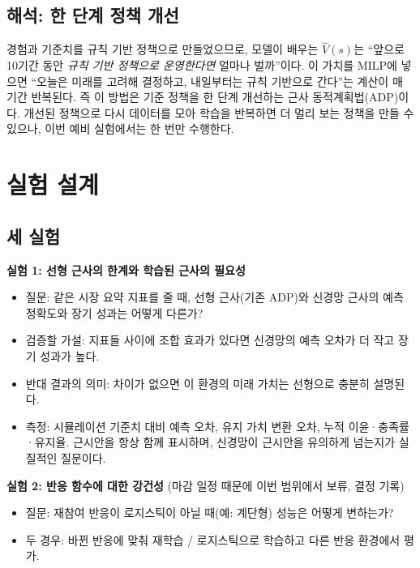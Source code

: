 \documentclass[11pt,a4paper]{article}
\begin{document}
\subsection{해석: 한 단계 정책 개선}

경험과 기준치를 규칙 기반 정책으로 만들었으므로, 모델이 배우는 $\hat V(s)$는
``앞으로 10기간 동안 \emph{규칙 기반 정책으로 운영한다면} 얼마나 벌까''이다.
이 가치를 MILP에 넣으면 ``오늘은 미래를 고려해 결정하고, 내일부터는 규칙 기반으로 간다''는
계산이 매 기간 반복된다. 즉 이 방법은 기준 정책을 한 단계 개선하는 근사 동적계획법(ADP)이다.
개선된 정책으로 다시 데이터를 모아 학습을 반복하면 더 멀리 보는 정책을 만들 수 있으나,
이번 예비 실험에서는 한 번만 수행한다.

\section{실험 설계}

\subsection{세 실험}

\textbf{실험 1: 선형 근사의 한계와 학습된 근사의 필요성}
\begin{itemize}[leftmargin=1.5em]
  \item 질문: 같은 시장 요약 지표를 줄 때, 선형 근사(기존 ADP)와 신경망 근사의
        예측 정확도와 장기 성과는 어떻게 다른가?
  \item 검증할 가설: 지표들 사이에 조합 효과가 있다면 신경망의 예측 오차가 더 작고 장기 성과가 높다.
  \item 반대 결과의 의미: 차이가 없으면 이 환경의 미래 가치는 선형으로 충분히 설명된다.
  \item 측정: 시뮬레이션 기준치 대비 예측 오차, 유지 가치 변환 오차, 누적 이윤·충족률·유지율.
        근시안을 항상 함께 표시하며, 신경망이 근시안을 유의하게 넘는지가 실질적인 질문이다.
\end{itemize}

\textbf{실험 2: 반응 함수에 대한 강건성} (마감 일정 때문에 이번 범위에서 보류, 결정 기록)
\begin{itemize}[leftmargin=1.5em]
  \item 질문: 재참여 반응이 로지스틱이 아닐 때(예: 계단형) 성능은 어떻게 변하는가?
  \item 두 경우: 바뀐 반응에 맞춰 재학습 / 로지스틱으로 학습하고 다른 반응 환경에서 평가.
\end{itemize}
\end{document}
